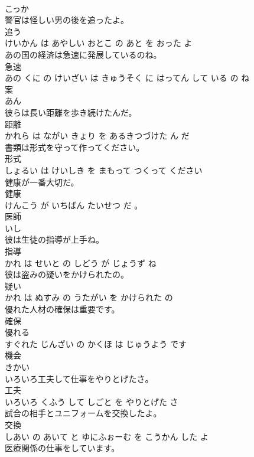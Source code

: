 \documentclass[8pt]{extreport}
\begin{document}
\begin{CJK}{UTF8}{min}
\\	こっか			
\\	警官は怪しい男の後を追ったよ。	
\\	追う 
\\	けいかん は あやしい おとこ の あと を おった よ			
\\	あの国の経済は急速に発展しているのね。	
\\	急速 
\\	あの くに の けいざい は きゅうそく に はってん して いる の ね			
\\	案	
\\	あん			
\\	彼らは長い距離を歩き続けたんだ。	
\\	距離 
\\	かれら は ながい きょり を あるきつづけた ん だ			
\\	書類は形式を守って作ってください。	
\\	形式 
\\	しょるい は けいしき を まもって つくって ください			
\\	健康が一番大切だ。	
\\	健康 
\\	けんこう が いちばん たいせつ だ 。			
\\	医師	
\\	いし			
\\	彼は生徒の指導が上手ね。	
\\	指導 
\\	かれ は せいと の しどう が じょうず ね			
\\	彼は盗みの疑いをかけられたの。	
\\	疑い 
\\	かれ は ぬすみ の うたがい を かけられた の			
\\	優れた人材の確保は重要です。	
\\	確保 
\\	優れる 
\\	すぐれた じんざい の かくほ は じゅうよう です			
\\	機会	
\\	きかい			
\\	いろいろ工夫して仕事をやりとげたさ。	
\\	工夫 
\\	いろいろ くふう して しごと を やりとげた さ			
\\	試合の相手とユニフォームを交換したよ。	
\\	交換 
\\	しあい の あいて と ゆにふぉーむ を こうかん した よ			
\\	医療関係の仕事をしています。	

\end{CJK}
\end{document}
